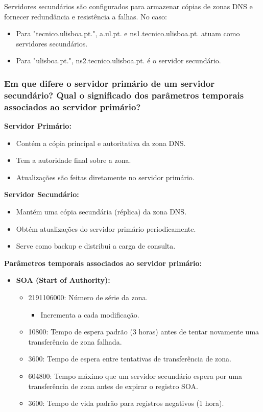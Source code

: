 Servidores secundários são configurados para armazenar cópias de 
zonas DNS e fornecer redundância e resistência a falhas. No caso:

\begin{itemize}
    \item Para "tecnico.ulisboa.pt.", a.ul.pt. e ns1.tecnico.ulisboa.pt. atuam como servidores secundários.
    \item Para "ulisboa.pt.", ns2.tecnico.ulisboa.pt. é o servidor secundário.
\end{itemize}

\subsubsection{Em que difere o servidor primário de um servidor secundário? Qual o significado dos parâmetros
temporais associados ao servidor primário?}

\textbf{Servidor Primário:}
\begin{itemize}
    \item Contém a cópia principal e autoritativa da zona DNS.
    \item Tem a autoridade final sobre a zona.
    \item Atualizações são feitas diretamente no servidor primário.
\end{itemize}


\textbf{Servidor Secundário:}
\begin{itemize}
    \item Mantém uma cópia secundária (réplica) da zona DNS.
    \item Obtém atualizações do servidor primário periodicamente.
    \item Serve como backup e distribui a carga de consulta.
\end{itemize}

\textbf{Parâmetros temporais associados ao servidor primário:}
\begin{itemize}
    \item \textbf{SOA (Start of Authority):}
        \begin{itemize}
            \item 2191106000: Número de série da zona.
            \begin{itemize}
                \item Incrementa a cada modificação.
            \end{itemize}
            \item 10800: Tempo de espera padrão (3 horas) antes de tentar novamente uma transferência de zona falhada.
            \item 3600: Tempo de espera entre tentativas de transferência de zona.
            \item 604800: Tempo máximo que um servidor secundário espera por uma transferência de zona antes de expirar o registro SOA.
            \item 3600: Tempo de vida padrão para registros negativos (1 hora).
        \end{itemize}
\end{itemize}

